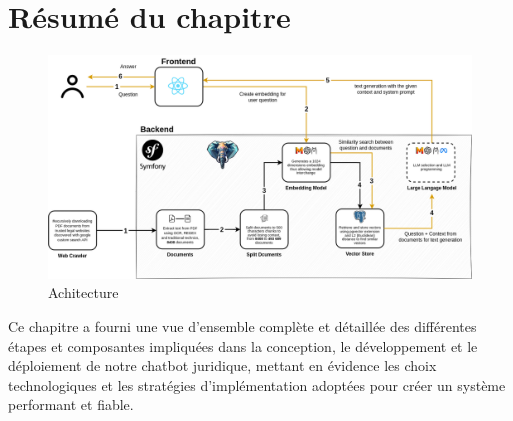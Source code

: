 \section{Résumé du chapitre}

\begin{figure}[H]
    \centering
    \includegraphics[width=15cm]{gfx/architecture.png}
    \caption{Achitecture}
    \label{fig:architecture-juro}
\end{figure}

Ce chapitre a fourni une vue d'ensemble complète et détaillée des différentes étapes et composantes impliquées dans la conception, le développement et le déploiement de notre chatbot juridique, mettant en évidence les choix technologiques et les stratégies d'implémentation adoptées pour créer un système performant et fiable.
